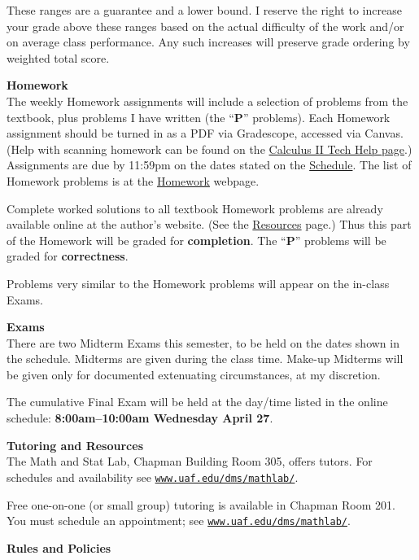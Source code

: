 \documentclass[12pt]{article}
\renewcommand{\emph}[1]{\textsf{\textbf{#1}}}
\newcommand{\localhead}[1]{\par\smallskip\textbf{#1} \smallskip\nobreak\\}%
\def\heading#1{\localhead{\large\emph{#1}}}
\begin{document}
\vspace{-3mm}
These ranges are a guarantee and a lower bound. I reserve the right to increase your grade above these ranges based on the actual difficulty of the work and/or on average class performance. Any such increases will preserve grade ordering by weighted total score. 


\heading{Homework}
The weekly Homework assignments will include a selection of problems from the textbook, plus problems I have written (the ``\textbf{P}'' problems).  Each Homework assignment should be turned in as a PDF via Gradescope, accessed via Canvas.  (Help with scanning homework can be found on the \href{https://uaf-math251.github.io/techHelp.html}{Calculus II Tech Help page}.)  Assignments are due by 11:59pm on the dates stated on the \href{https://bueler.github.io/math314/assets/general/schedule.pdf}{Schedule}.  The list of Homework problems is at the \href{https://bueler.github.io/math314/homework.html}{Homework} webpage.

Complete worked solutions to all textbook Homework problems are already available online at the author's website.  (See the \href{https://bueler.github.io/math314/resources.html}{Resources} page.)  Thus this part of the Homework will be graded for \emph{completion}.  The ``\textbf{P}'' problems will be graded for \emph{correctness}.

Problems very similar to the Homework problems will appear on the in-class Exams.


\heading{Exams}
There are two Midterm Exams this semester, to be held on the dates shown in the schedule.  Midterms are given during the class time.  Make-up Midterms will be given only for documented extenuating circumstances, at my discretion.

The cumulative Final Exam will be held at the day/time listed in the online schedule: \textbf{8:00am--10:00am Wednesday April 27}.


\heading{Tutoring and Resources}
The Math and Stat Lab, Chapman Building Room 305, offers tutors.  For schedules and availability see \href{http://www.uaf.edu/dms/mathlab/}{\texttt{www.uaf.edu/dms/mathlab/}}.

Free one-on-one (or small group) tutoring is available in Chapman Room 201. You must schedule an appointment; see \href{http://www.uaf.edu/dms/mathlab/}{\texttt{www.uaf.edu/dms/mathlab/}}.


\clearpage\newpage
\phantom{foo}

\heading{Rules and Policies}
\vskip -20pt
\end{document}
